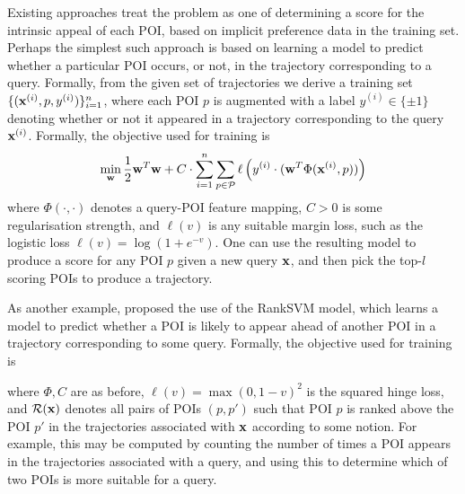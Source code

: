 
Existing approaches treat the problem as one of determining a score for the intrinsic appeal of each POI,
based on implicit preference data in the training set.
Perhaps the simplest such approach is based on learning a model to predict whether a particular POI occurs, or not, in the trajectory corresponding to a query.
Formally, from the given set of trajectories
we derive a training set $\{ ( \mathbf{x}^{(i)}, p, y^{(i)} ) \}_{i = 1}^n$,
where each POI $p$ is augmented with a label $y^{(i)} \in \{ \pm 1 \}$ denoting whether or not it appeared in a trajectory corresponding to the query $\mathbf{x}^{(i)}$. 
Formally, the objective used for training is
$$ \min_{\mathbf{w}} \frac{1}{2} \mathbf{w}^T \mathbf{w} + C \cdot \sum_{i = 1}^n \sum_{p \in \mathcal{P}} \ell\left( y^{(i)} \cdot ( \mathbf{w}^T \Phi( \mathbf{x}^{(i)}, p ) ) \right) $$
where
$\Phi( \cdot, \cdot )$ denotes a query-POI feature mapping,
$C > 0$ is some regularisation strength,
and $\ell( v )$ is any suitable margin loss, such as the logistic loss $\ell( v ) = \log( 1 + e^{-v} )$.
One can use the resulting model to produce a score for any POI $p$ given a new query $\mathbf{x}$,
and then pick the top-$l$ scoring POIs to produce a trajectory.

As another example, \citet{cikm16paper} proposed the use of the RankSVM model,
which %
learns a model to predict whether a POI is likely to appear ahead of another POI in a trajectory corresponding to some query.
Formally, the objective used for training is


where $\Phi, C$ are as before,
$\ell( v ) = \max( 0, 1 - v )^2$ is the squared hinge loss,
and
$\mathcal{R}( \mathbf{x} )$
denotes all pairs of POIs $(p, p')$ such that
POI $p$ is ranked above the POI $p'$ in the trajectories associated with $\mathbf{x}$ according to some notion.
For example, this may be computed by counting the number of times a POI appears in the trajectories associated with a query, 
and using this to determine which of two POIs is more suitable for a query.

